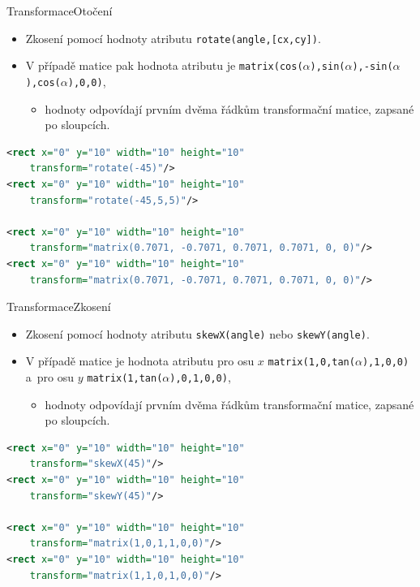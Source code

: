 \begin{frame}[t,fragile]{Transformace}{Otočení}
    \begin{itemize}
        \item Zkosení pomocí hodnoty atributu \texttt{rotate(angle,[cx,cy])}.
        \item V případě matice pak hodnota atributu je \texttt{matrix(cos($\alpha$),sin($\alpha$),-sin($\alpha$),cos($\alpha$),0,0)},
        \begin{itemize}
            \item hodnoty odpovídají prvním dvěma řádkům transformační matice, zapsané po sloupcích. 
        \end{itemize}
    \end{itemize}
    
    \begin{lstlisting}[language=XML,basicstyle={\small\ttfamily}]
<rect x="0" y="10" width="10" height="10" 
    transform="rotate(-45)"/>
<rect x="0" y="10" width="10" height="10" 
    transform="rotate(-45,5,5)"/>

<rect x="0" y="10" width="10" height="10" 
    transform="matrix(0.7071, -0.7071, 0.7071, 0.7071, 0, 0)"/>
<rect x="0" y="10" width="10" height="10" 
    transform="matrix(0.7071, -0.7071, 0.7071, 0.7071, 0, 0)"/>
    \end{lstlisting}
\end{frame}

\begin{frame}[t,fragile]{Transformace}{Zkosení}
    \begin{itemize}
        \item Zkosení pomocí hodnoty atributu \texttt{skewX(angle)} nebo \texttt{skewY(angle)}.
        \item V případě matice je hodnota atributu pro osu $x$ \texttt{matrix(1,0,tan($\alpha$),1,0,0)}\\
              a~pro osu $y$ \texttt{matrix(1,tan($\alpha$),0,1,0,0)},
        \begin{itemize}
            \item hodnoty odpovídají prvním dvěma řádkům transformační matice, zapsané po sloupcích. 
        \end{itemize}
    \end{itemize}
    
    \begin{lstlisting}[language=XML,basicstyle={\small\ttfamily}]
<rect x="0" y="10" width="10" height="10" 
    transform="skewX(45)"/>
<rect x="0" y="10" width="10" height="10" 
    transform="skewY(45)"/>

<rect x="0" y="10" width="10" height="10" 
    transform="matrix(1,0,1,1,0,0)"/>
<rect x="0" y="10" width="10" height="10" 
    transform="matrix(1,1,0,1,0,0)"/>
    \end{lstlisting}
\end{frame}